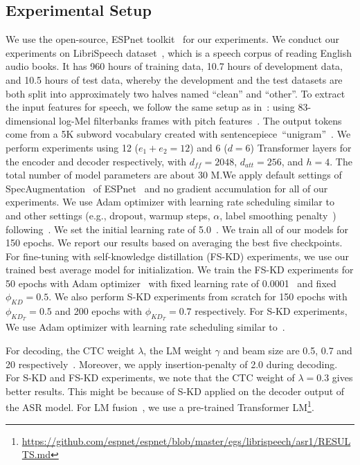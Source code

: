 \documentclass{article}
\begin{document}
\subsection{Experimental Setup}
We use the open-source, ESPnet toolkit~\citep{espnet} for our experiments. We conduct our experiments on LibriSpeech dataset~\citep{panayotov2015librispeech}, which is a speech corpus of reading English audio books. It has 960 hours of training data, 10.7 hours of development data, and 10.5 hours of test data, whereby the development and the test datasets are both split into approximately two halves named “clean” and “other”. To extract the input features for speech, we follow the same setup as in~\citep{espnet, karita2019asru}: using 83-dimensional log-Mel filterbanks frames with pitch features~\citep{karita2019asru,moritz2020}. The output tokens come from a 5K subword vocabulary created with sentencepiece~\citep{kudo2018sentencepiece}``unigram''~\citep{espnet}. We perform experiments using 12 ($e_1+e_2=12$) and 6 ($d=6$) Transformer layers for the encoder and decoder respectively, with $d_{ff}=2048$, $d_{att}=256$, and $h=4$. The total number of model parameters are about 30 M.We apply default settings of SpecAugmentation~\citep{specaugment} of ESPnet~\citep{espnet} and no gradient accumulation for all of our experiments. We use Adam optimizer with learning rate scheduling similar to~\citep{vaswani2017attention,espnet} and other  settings (e.g., dropout, warmup steps, $\alpha$, label smoothing penalty~\citep{specaugment}) following~\citep{moritz2020,espnet}. We set the initial learning rate of 5.0~\citep{espnet}. We train all of our models for 150 epochs. We report our results based on averaging the best five checkpoints. 
For fine-tuning with self-knowledge distillation (FS-KD) experiments, we use our trained best average model for initialization. We train the FS-KD experiments for 50 epochs with Adam optimizer~\citep{adam} with fixed learning rate of 0.0001~\citep{espnet} and fixed $\phi_{KD}=0.5$. We also perform S-KD experiments from scratch for 150 epochs with $\phi_{KD_T}=0.5$ and 200 epochs with $\phi_{KD_T}=0.7$ respectively. For S-KD experiments, We use Adam optimizer with learning rate scheduling similar to~\citep{vaswani2017attention,espnet}.

For decoding, the CTC weight $\lambda$, the LM weight $\gamma$ and beam size are 0.5, 0.7 and 20 respectively~\citep{moritz2020,espnet}. Moreover, we apply insertion-penalty of 2.0 during decoding. For S-KD and FS-KD experiments, we note that the CTC weight of $\lambda=0.3$ gives better results. This might be because of S-KD applied on the decoder output of the ASR model. For LM fusion~\citep{shallow2018}, we use a pre-trained Transformer LM\footnote{ \url{https://github.com/espnet/espnet/blob/master/egs/librispeech/asr1/RESULTS.md}}.
\end{document}

